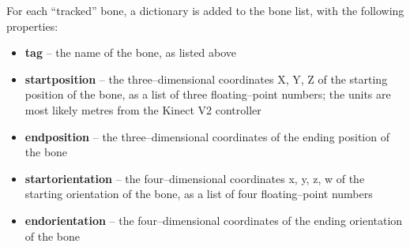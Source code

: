 For each ``tracked'' bone, a dictionary is added to the bone list, with the following
properties:
\begin{itemize}
\item \textbf{tag} -- the name of the bone, as listed above
\item \textbf{startposition} -- the three--dimensional coordinates \openSq{}X, Y,
Z\closeSq{} of the starting position of the bone, as a list of three floating--point
numbers; the units are most likely metres from the Kinect V2 controller
\item \textbf{endposition} -- the three--dimensional coordinates of the ending position of
the bone
\item \textbf{startorientation} -- the four--dimensional coordinates \openSq{}x, y,
z, w\closeSq{} of the starting orientation of the bone, as a list of four floating--point
numbers
\item \textbf{endorientation} -- the four--dimensional coordinates of the ending
orientation of the bone
\end{itemize}
\primaryEnd{}
